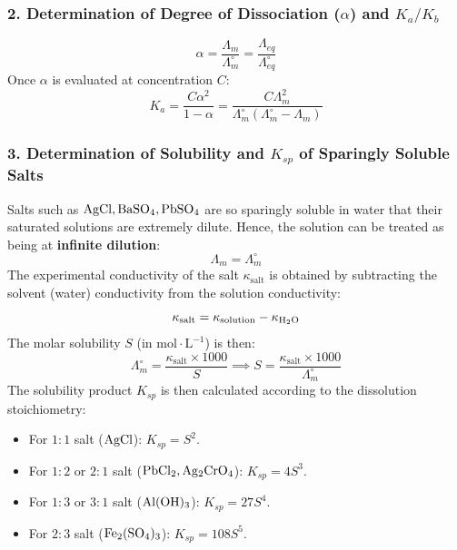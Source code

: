\subsubsection{2. Determination of Degree of Dissociation ($\alpha$) and $K_a / K_b$}
\begin{equation}
    \alpha = \frac{\Lambda_m}{\Lambda_m^\circ} = \frac{\Lambda_{eq}}{\Lambda_{eq}^\circ}
\end{equation}
Once $\alpha$ is evaluated at concentration $C$:
\begin{equation}
    K_a = \frac{C \alpha^2}{1 - \alpha} = \frac{C \Lambda_m^2}{\Lambda_m^\circ (\Lambda_m^\circ - \Lambda_m)}
\end{equation}

\subsubsection{3. Determination of Solubility and $K_{sp}$ of Sparingly Soluble Salts}
Salts such as $\ce{AgCl}, \ce{BaSO4}, \ce{PbSO4}$ are so sparingly soluble in water that their saturated solutions are extremely dilute. Hence, the solution can be treated as being at \textbf{infinite dilution}:
\begin{equation}
    \Lambda_m = \Lambda_m^\circ
\end{equation}
The experimental conductivity of the salt $\kappa_{\text{salt}}$ is obtained by subtracting the solvent (water) conductivity from the solution conductivity:
\begin{equation}
    \kappa_{\text{salt}} = \kappa_{\text{solution}} - \kappa_{\ce{H2O}}
\end{equation}
The molar solubility $S$ (in $\text{mol}\cdot\text{L}^{-1}$) is then:
\begin{equation}
    \Lambda_m^\circ = \frac{\kappa_{\text{salt}} \times 1000}{S} \implies \boxed{S = \frac{\kappa_{\text{salt}} \times 1000}{\Lambda_m^\circ}}
\end{equation}
The solubility product $K_{sp}$ is then calculated according to the dissolution stoichiometry:
\begin{itemize}
    \item For $1:1$ salt ($\ce{AgCl}$): $K_{sp} = S^2$.
    \item For $1:2$ or $2:1$ salt ($\ce{PbCl2}, \ce{Ag2CrO4}$): $K_{sp} = 4S^3$.
    \item For $1:3$ or $3:1$ salt ($\ce{Al(OH)3}$): $K_{sp} = 27S^4$.
    \item For $2:3$ salt ($\ce{Fe2(SO4)3}$): $K_{sp} = 108S^5$.
\end{itemize}

